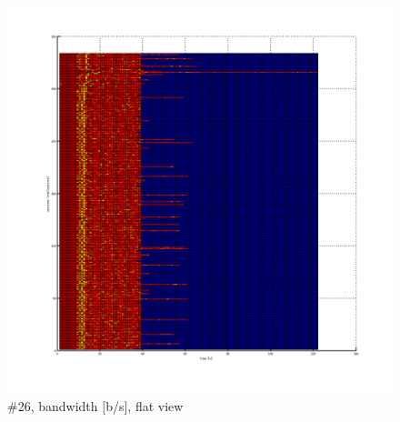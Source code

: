 \begin{figure}[htb]
	\begin{center}
	\includegraphics[width=\textwidth]{results-269-2d.png}
	\end{center}
	\caption[]{\#26, bandwidth [b/s], flat view}
	\label{img:results-269-2d.png}
\end{figure}
\FloatBarrier
\clearpage

